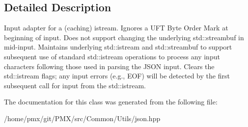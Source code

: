 \subsection{Detailed Description}
Input adapter for a (caching) istream. Ignores a U\+FT Byte Order Mark at beginning of input. Does not support changing the underlying std\+::streambuf in mid-\/input. Maintains underlying std\+::istream and std\+::streambuf to support subsequent use of standard std\+::istream operations to process any input characters following those used in parsing the J\+S\+ON input. Clears the std\+::istream flags; any input errors (e.\+g., E\+OF) will be detected by the first subsequent call for input from the std\+::istream. 

The documentation for this class was generated from the following file\+:\begin{DoxyCompactItemize}
\item 
/home/pmx/git/\+P\+M\+X/src/\+Common/\+Utils/json.\+hpp\end{DoxyCompactItemize}

